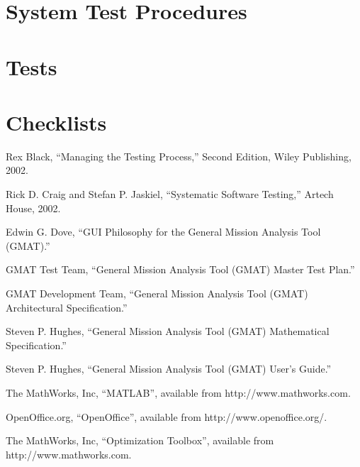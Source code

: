 \documentclass[10 pt]{book}
\begin{document}


\part{System Test Procedures}
\thispagestyle{empty}









\part{Tests}





\part{Checklists}




%
%
%
%
%
%
%
%
\backmatter

\begin{thebibliography}{poseidon} %

 Rex Black, ``Managing the Testing Process,'' Second Edition, Wiley
Publishing, 2002.

 Rick D. Craig and Stefan P. Jaskiel, ``Systematic Software Testing,'' Artech
House, 2002.

 Edwin G. Dove, ``GUI Philosophy for the General Mission Analysis Tool
(GMAT).''

 GMAT Test Team, ``General Mission Analysis Tool (GMAT) Master Test Plan.''

 GMAT Development Team, ``General Mission Analysis Tool (GMAT) Architectural
Specification.''

 Steven P. Hughes, ``General Mission Analysis Tool (GMAT) Mathematical
Specification.''

 Steven P. Hughes, ``General Mission Analysis Tool (GMAT) User's Guide.''

 The MathWorks, Inc, ``MATLAB'', available from http://www.mathworks.com.

 OpenOffice.org, ``OpenOffice'', available from http://www.openoffice.org/.

 The MathWorks, Inc, ``Optimization Toolbox'', available from
http://www.mathworks.com.


\end{thebibliography}
\end{document}
